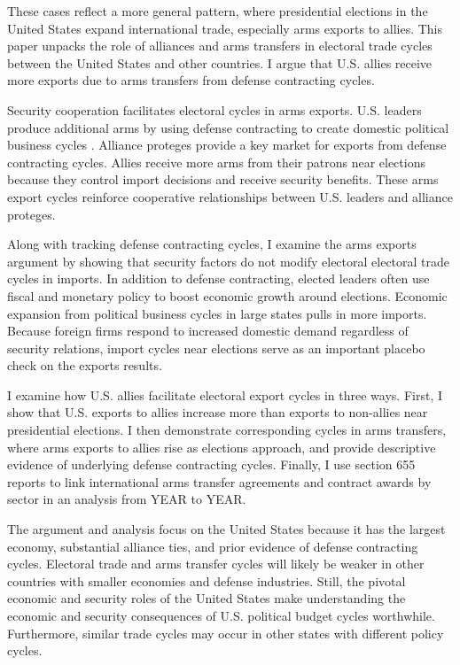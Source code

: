\documentclass[12pt]{article}
\begin{document}
These cases reflect a more general pattern, where presidential elections in the United States expand international trade, especially arms exports to allies.
This paper unpacks the role of alliances and arms transfers in electoral trade cycles between the United States and other countries. 
I argue that U.S. allies receive more exports due to arms transfers from defense contracting cycles. 


Security cooperation facilitates electoral cycles in arms exports. 
U.S. leaders produce additional arms by using defense contracting to create domestic political business cycles \citep{Tufte1978, Mintz1988, Mayer1995, DerouenHeo2000, Becker2021}.
Alliance proteges provide a key market for exports from defense contracting cycles.
Allies receive more arms from their patrons near elections because they control import decisions and receive security benefits. 
These arms export cycles reinforce cooperative relationships between U.S. leaders and alliance proteges.


Along with tracking defense contracting cycles, I examine the arms exports argument by showing that security factors do not modify electoral electoral trade cycles in imports.
In addition to defense contracting, elected leaders often use fiscal and monetary policy \citep{Nordhaus1975, Tufte1978, Rogoff1987, ClarkHallerberg2000} to boost economic growth around elections. 
Economic expansion from political business cycles in large states pulls in more imports.
Because foreign firms respond to increased domestic demand regardless of security relations, import cycles near elections serve as an important placebo check on the exports results.


I examine how U.S. allies facilitate electoral export cycles in three ways. 
First, I show that U.S. exports to allies increase more than exports to non-allies near presidential elections. 
I then demonstrate corresponding cycles in arms transfers, where arms exports to allies rise as elections approach, and provide descriptive evidence of underlying defense contracting cycles.
Finally, I use section 655 reports to link international arms transfer agreements and contract awards by sector in an analysis from YEAR to YEAR.


The argument and analysis focus on the United States because it has the largest economy, substantial alliance ties, and prior evidence of defense contracting cycles. 
Electoral trade and arms transfer cycles will likely be weaker in other countries with smaller economies and defense industries. 
Still, the pivotal economic and security roles of the United States make understanding the economic and security consequences of U.S. political budget cycles worthwhile.
Furthermore, similar trade cycles may occur in other states with different policy cycles. 
\end{document}

